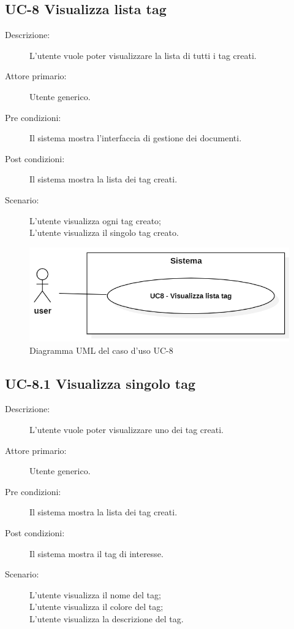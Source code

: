 \subsection{UC-8 Visualizza lista tag}
\begin{description}
    \item[Descrizione:] L’utente vuole poter visualizzare la lista di tutti i tag creati.
    \item[Attore primario:] Utente generico.
    \item[Pre condizioni:] Il sistema mostra l'interfaccia di gestione dei documenti.
    \item[Post condizioni:] Il sistema mostra la lista dei tag creati.
    \item[Scenario:] L'utente visualizza ogni tag creato;\\L'utente visualizza il singolo tag creato.
\end{description}
\begin{figure}[H]
    \centering
    \includegraphics[width=0.8\linewidth]{UC8.PNG}
    \caption{Diagramma UML del caso d'uso UC-8}
    \label{fig:UC8}
\end{figure}

\subsection{UC-8.1 Visualizza singolo tag}
\begin{description}
    \item[Descrizione:] L’utente vuole poter visualizzare uno dei tag creati.
    \item[Attore primario:] Utente generico.
    \item[Pre condizioni:] Il sistema mostra la lista dei tag creati.
    \item[Post condizioni:] Il sistema mostra il tag di interesse.
    \item[Scenario:] L'utente visualizza il nome del tag;\\L'utente visualizza il colore del tag;\\L'utente visualizza la descrizione del tag.
\end{description}

